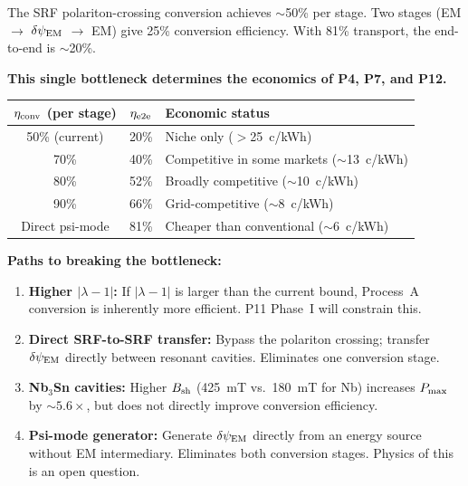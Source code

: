 \documentclass[11pt]{article}
\newcommand{\dpsiEM}{\delta\psi_{\rm EM}}
\newcommand{\lambdaone}{|\lambda{-}1|}
\begin{document}
\begin{tcolorbox}[colback=red!5!white, colframe=red!60!black,
  title=\textbf{THE BINDING CONSTRAINT: 50\% SRF Conversion Efficiency}]

The SRF polariton-crossing conversion achieves $\sim$50\% per stage.
Two stages (EM $\to$ $\dpsiEM$ $\to$ EM) give 25\% conversion
efficiency. With 81\% transport, the end-to-end is $\sim$20\%.

\textbf{This single bottleneck determines the economics of P4, P7,
and P12.}

\begin{center}
\begin{tabular}{@{}ccl@{}}
\toprule
$\eta_{\rm conv}$ (per stage) & $\eta_{\rm e2e}$ & Economic status \\
\midrule
50\% (current) & 20\% & Niche only ($>$25~c/kWh) \\
70\% & 40\% & Competitive in some markets ($\sim$13~c/kWh) \\
80\% & 52\% & Broadly competitive ($\sim$10~c/kWh) \\
90\% & 66\% & Grid-competitive ($\sim$8~c/kWh) \\
Direct psi-mode & 81\% & Cheaper than conventional ($\sim$6~c/kWh) \\
\bottomrule
\end{tabular}
\end{center}

\textbf{Paths to breaking the bottleneck:}
\begin{enumerate}[nosep]
\item \textbf{Higher $\lambdaone$:} If $\lambdaone$ is larger than
  the current bound, Process~A conversion is inherently more efficient.
  P11 Phase~I will constrain this.
\item \textbf{Direct SRF-to-SRF transfer:} Bypass the polariton
  crossing; transfer $\dpsiEM$ directly between resonant cavities.
  Eliminates one conversion stage.
\item \textbf{Nb$_3$Sn cavities:} Higher $B_{\rm sh}$ (425~mT vs.\
  180~mT for Nb) increases $P_{\rm max}$ by $\sim 5.6\times$, but
  does not directly improve conversion efficiency.
\item \textbf{Psi-mode generator:} Generate $\dpsiEM$ directly from
  an energy source without EM intermediary. Eliminates both conversion
  stages. Physics of this is an open question.
\end{enumerate}
\end{tcolorbox}

\end{document}
